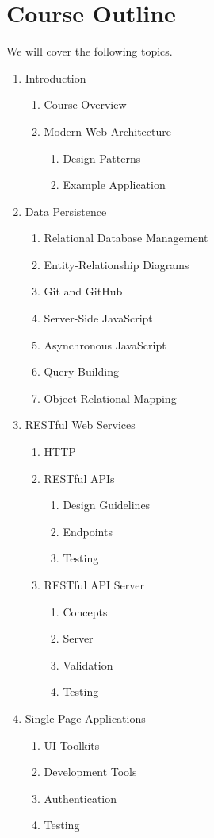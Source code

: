 \documentclass[11pt]{article}
\begin{document}
\section{Course Outline}

We will cover the following topics.
\begin{enumerate}
\item Introduction
  \begin{enumerate}
  \item Course Overview
  \item Modern Web Architecture
    \begin{enumerate}
    \item Design Patterns
    \item Example Application
    \end{enumerate}
  \end{enumerate}
\item Data Persistence
  \begin{enumerate}
  \item Relational Database Management
  \item Entity-Relationship Diagrams
  \item Git and GitHub
  \item Server-Side JavaScript
  \item Asynchronous JavaScript
  \item Query Building
  \item Object-Relational Mapping
  \end{enumerate}
\item RESTful Web Services
  \begin{enumerate}
  \item HTTP
  \item RESTful APIs
    \begin{enumerate}
    \item Design Guidelines
    \item Endpoints
    \item Testing
    \end{enumerate}
  \item RESTful API Server
    \begin{enumerate}
    \item Concepts
    \item Server
    \item Validation
    \item Testing
    \end{enumerate}
  \end{enumerate}
\item Single-Page Applications
  \begin{enumerate}
  \item UI Toolkits
  \item Development Tools
  \item Authentication
  \item Testing
  \end{enumerate}
\end{enumerate}
\end{document}

